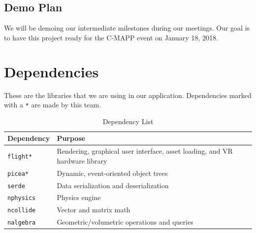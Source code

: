 \documentclass[titlepage,12pt]{article}
\begin{document}
\subsection{Demo Plan}
We will be demoing our intermediate milestones during our meetings. Our goal is
to have this project ready for the C-MAPP event on January 18, 2018.

\section{Dependencies}
These are the libraries that we are using in our application. Dependencies
marked with a \texttt{*} are made by this team.
\begin{table}[H]
    \caption{Dependency List}\label{tab:milestones}
    \centering
    \begin{tabular}{|l|p{12cm}|}
        \hline
        \textbf{Dependency} & \textbf{Purpose} \\
        \hline
        \hline
        \texttt{flight*} & Rendering, graphical user interface, asset loading,
            and VR hardware library \\
        \hline
        \texttt{picea*} & Dynamic, event-oriented object trees \\
        \hline
        \texttt{serde} & Data serialization and deserialization \\
        \hline
        \texttt{nphysics} & Physics engine \\
        \hline
        \texttt{ncollide} & Vector and matrix math \\
        \hline
        \texttt{nalgebra} & Geometric/volumetric operations and queries \\
        \hline
    \end{tabular}
\end{table}
\end{document}
